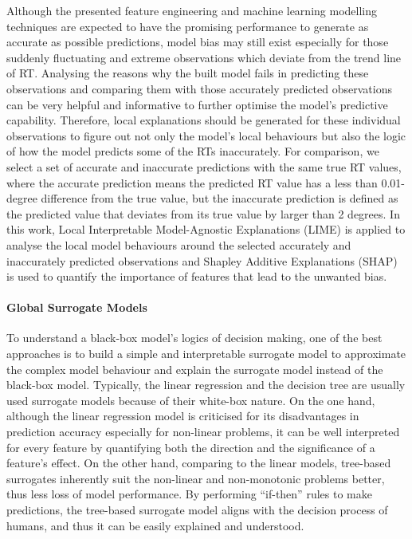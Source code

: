 \documentclass[11pt]{article}
\begin{document}
    Although the presented feature engineering and machine learning modelling techniques are expected to have the promising performance to generate as accurate as possible predictions, model bias may still exist especially for those suddenly fluctuating and extreme observations which deviate from the trend line of RT. Analysing the reasons why the built model fails in predicting these observations and comparing them with those accurately predicted observations can be very helpful and informative to further optimise the model’s predictive capability. Therefore, local explanations should be generated for these individual observations to figure out not only the model’s local behaviours but also the logic of how the model predicts some of the RTs inaccurately. For comparison, we select a set of accurate and inaccurate predictions with the same true RT values, where the accurate prediction means the predicted RT value has a less than 0.01-degree difference from the true value, but the inaccurate prediction is defined as the predicted value that deviates from its true value by larger than 2 degrees. In this work, Local Interpretable Model-Agnostic Explanations (LIME)\citep{ribeiro2016should} is applied to analyse the local model behaviours around the selected accurately and inaccurately predicted observations and Shapley Additive Explanations (SHAP)\citep{lundberg2017unified} is used to quantify the importance of features that lead to the unwanted bias.
    
    \paragraph{Global Surrogate Models}
    To understand a black-box model’s logics of decision making, one of the best approaches is to build a simple and interpretable surrogate model to approximate the complex model behaviour and explain the surrogate model instead of the black-box model. Typically, the linear regression and the decision tree are usually used surrogate models because of their white-box nature. On the one hand, although the linear regression model is criticised for its disadvantages in prediction accuracy especially for non-linear problems, it can be well interpreted for every feature by quantifying both the direction and the significance of a feature’s effect. On the other hand, comparing to the linear models, tree-based surrogates inherently suit the non-linear and non-monotonic problems better, thus less loss of model performance. By performing “if-then” rules to make predictions, the tree-based surrogate model aligns with the decision process of humans, and thus it can be easily explained and understood.
    
\end{document}
